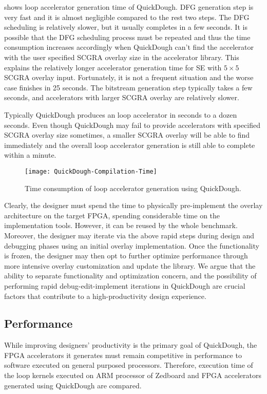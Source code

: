  shows loop accelerator generation time of QuickDough.
DFG generation step is very fast and it is almost negligible compared to the rest two steps. The DFG
scheduling is relatively slower, but it usually completes in a few seconds.
It is possible that the DFG scheduling process must be repeated and thus the time consumption
increases accordingly when QuickDough can't find the accelerator with the user specified SCGRA
overlay size in the accelerator library. This explains the relatively longer accelerator generation
time for SE with $5 \times 5$ SCGRA overlay input. Fortunately, it is not a frequent situation and
the worse case finishes in 25 seconds. The bitstream generation step typically takes a few seconds, and
accelerators with larger SCGRA overlay are relatively slower.

Typically QuickDough produces an loop accelerator in seconds to a dozen seconds. Even though
QuickDough may fail to provide accelerators with specified SCGRA overlay size sometimes, a smaller
SCGRA overlay will be able to find immediately and the overall loop accelerator generation is still
able to complete within a minute.
\begin{figure}
\centering
\texttt{[image: QuickDough-Compilation-Time]}
\caption{Time consumption of loop accelerator generation using QuickDough.}
\label{fig:SCGRA-Overlay-Compilation-Time}
\end{figure}

Clearly, the designer must spend the time to physically pre-implement 
the overlay architecture on the target FPGA, spending considerable 
time on the implementation tools. However, it can be reused by the whole benchmark.
Moreover, the designer may iterate via the above rapid steps during 
design and debugging phases using an initial overlay implementation.
Once the functionality is frozen, the designer may then opt to further optimize 
performance through more intensive overlay customization and update the library. 
We argue that the ability to separate functionality and optimization 
concern, and the possibility of performing rapid debug-edit-implement 
iterations in QuickDough are crucial factors that contribute to a high-productivity 
design experience.

\subsection{Performance} \label{subsec:acc-perf}
While improving designers' productivity is the primary goal of QuickDough, the FPGA accelerators it
generates must remain competitive in performance to software executed on general 
purposed processors. Therefore, execution time of the loop kernels executed on ARM 
processor of Zedboard and FPGA accelerators generated using QuickDough are compared.

